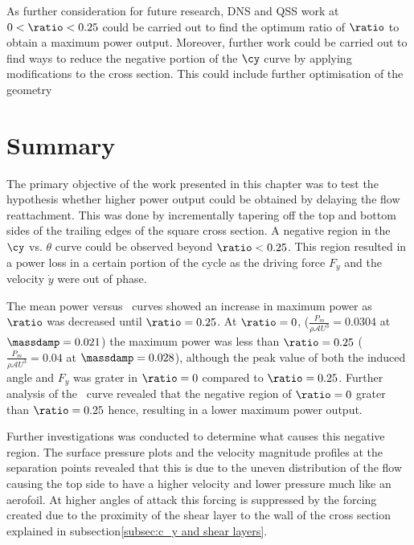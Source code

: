 As further consideration for future research, DNS and QSS work at $0<\ratio<0.25$ could be carried out to find the optimum ratio of $\ratio$ to obtain a maximum power output. Moreover, further work could be carried out to find ways to reduce the negative portion of the $\cy$ curve by applying modifications to the cross section. This could include further optimisation of the geometry 

\section{Summary} 
\label{sec:summary-diff-cross-sec}

The primary objective of the work presented in this chapter was to test the hypothesis whether higher power output could be obtained by delaying the flow reattachment. This was done by incrementally tapering off the top and bottom sides of the trailing edges of the square cross section. A negative region in the $\cy$ vs. $\theta$ curve could be observed beyond $\ratio<0.25$. This region resulted in a power loss in a certain portion of the cycle as the driving force $F_y$ and the velocity $\dot{y}$ were out of phase.

The mean power versus \massdamp\ curves showed an increase in maximum power as $\ratio$ was decreased until $\ratio=0.25$. At $\ratio=0$,  ($\displaystyle\frac{P_{m}}{\rho \mathcal{A}U^3}=0.0304$ at $\massdamp=0.021$) the maximum power was less than $\ratio=0.25$ ($\displaystyle\frac{P_{m}}{\rho \mathcal{A}U^3}=0.04$ at $\massdamp=0.028$), although the peak value of both the induced angle and $F_{y}$ was grater in $\ratio=0$ compared to $\ratio=0.25$. Further analysis of the \cy\ curve revealed that the negative region of $\ratio=0$  grater than $\ratio=0.25$ hence, resulting in a lower maximum power output. 

Further investigations was conducted to determine what causes this negative region. The surface pressure plots and the velocity magnitude profiles at the separation points revealed that this is due to the uneven distribution of the flow causing the top side to have a higher velocity and lower pressure much like an aerofoil. At higher angles of attack this forcing is suppressed by the forcing created due to the proximity of the shear layer to the wall of the cross section explained in  subsection\ref{subsec:c_y and shear layers}.

